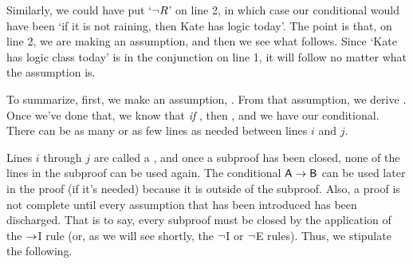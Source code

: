 Similarly, we could have put `${\neg} R$' on line 2, in which case our conditional would have been `if it is not raining, then Kate has logic today'. The point is that, on line 2, we are making an assumption, and then we see what follows. Since `Kate has logic class today' is in the conjunction on line 1, it will follow no matter what the assumption is.

To summarize, first, we make an assumption, . From that assumption, we derive . Once we've done that, we know that \textit{if} , then , and we have our conditional. 
\noindent There can be as many or as few lines as needed between lines $i$ and $j$. 

Lines $i$ through $j$ are called a , and once a subproof has been closed, none of the lines in the subproof can be used again. The conditional $\mathsf{A}\rightarrow\mathsf{B}$ can be used later in the proof (if it's needed) because it is outside of the subproof. Also, a proof is not complete until every assumption that has been introduced has been discharged. That is to say, every subproof must be closed by the application of the $\rightarrow$I rule (or, as we will see shortly, the ${\neg}$I or ${\neg}$E rules).
Thus, we stipulate the following.



